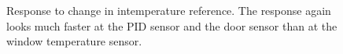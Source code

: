 \documentclass[12pt]{scrartcl}
\begin{document}
      \begin{figure}[H]
        \hspace{-40pt}
        \hspace{-20pt}
        \caption{Response to change in intemperature reference. The response
        again looks much faster at the PID sensor and the door sensor than at
        the window temperature sensor.}
        \label{fig14}
      \end{figure}
\end{document}
